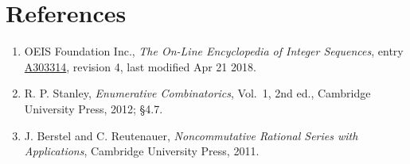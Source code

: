 \documentclass[11pt]{article}
\theoremstyle{definition}
\begin{document}
\section{References}

\begin{enumerate}

\item OEIS Foundation Inc., \emph{The On-Line Encyclopedia of Integer Sequences}, entry \href{https://oeis.org/A303314}{A303314}, revision 4, last modified Apr 21 2018.

\item R. P. Stanley, \emph{Enumerative Combinatorics}, Vol.~1, 2nd ed., Cambridge University Press, 2012; \S4.7.

\item J. Berstel and C. Reutenauer, \emph{Noncommutative Rational Series with Applications}, Cambridge University Press, 2011.

\end{enumerate}
\end{document}
